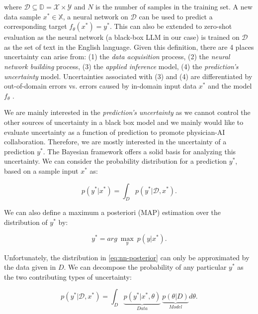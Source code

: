 where $\mathcal{D} \subseteq \mathbb{D} = \mathcal{X} \times \mathcal{Y}$ and $N$ is the number of samples in the training set. A new data sample $x^{*} \in \mathbb{X}$, a neural network on $\mathcal{D}$ can be used to predict a corresponding target $f_{\theta}(x^{*})=y^{*}$. This can also be extended to zero-shot evaluation as the neural network (a black-box LLM in our case) is trained on $\mathcal{D}$ as the set of text in the English language. Given this definition, there are 4 places uncertainty can arise from: (1) the \emph{data acquisition} process, (2) the \emph{neural network building} process, (3) the \emph{applied inference} model, (4) the \emph{prediction's uncertainty} model. Uncertainties associated with (3) and (4) are differentiated by out-of-domain errors vs. errors caused by in-domain input data $x^{*}$ and the model $f_{\theta}$ \cite{gawlikowskiSurveyUncertaintyDeep2023}. 

We are mainly interested in the \emph{prediction's uncertainty} as we cannot control the other sources of uncertainty in a black box model and we mainly would like to evaluate uncertainty as a function of prediction to promote physician-AI collaboration. Therefore, we are mostly interested in the uncertainty of a prediction $y^{*}$. The Bayesian framework offers a solid basis for analyzing this uncertainty. We can consider the probability distribution for a prediction $y^{*}$, based on a sample input $x^{*}$ as:

\begin{equation} \label{eq:nn-posterior}
p(y^{*}|x^{*}) = \int_{D}{p(y^{*}|\mathcal{D},x^{*})}.
\end{equation}

We can also define a maximum a posteriori (MAP) estimation over the distribution of $y^{*}$ by:

\begin{equation}\label{eq:nn-map}
y^{*} = arg\ \max\limits_{y}\ p(y|x^{*}).
\end{equation}

Unfortunately, the distribution in \eqref{eq:nn-posterior} can only be approximated by the data given in $D$. We can decompose the probability of any particular $y^{*}$ as the two contributing types of uncertainty: 

\begin{equation}\label{eq:nn-posterior-decompose}
p(y^{*}|\mathcal{D},x^{*}) = \int_{D}{\underbrace{p(y^{*}|x^{*},\theta)}_{Data}\ \underbrace{p(\theta|D)}_{Model}d\theta}.
\end{equation}

